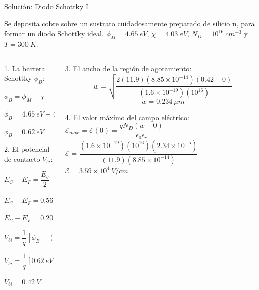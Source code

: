 \documentclass[10pt,t,aspectratio=169]{beamer}
\begin{document}
\begin{frame}{Solución: Diodo Schottky I}

Se deposita cobre sobre un sustrato cuidadosamente preparado de silicio n, para formar un diodo Schottky ideal. $\phi_M=4.65\ eV$, $\chi=4.03\ eV$, $N_D=10^{16}\ cm^{-3}$ y $T=300\ K$. 

\begin{columns}

\begin{column}{0.5\textwidth}

1. La barrera Schottky $\phi_B$:

$\phi_B = \phi_M - \chi$

$\phi_B = 4.65\ eV - 4.03\ eV$

$\phi_B = 0.62\ eV$

\vspace{5mm}

2. El potencial de contacto $V_{bi}$:

$E_C - E_F = \dfrac{E_g}{2} - kT \ln \dfrac{N_D}{n_i}$

$E_C - E_F = 0.56\ eV - 26\ meV \ln 10^6$

$E_C - E_F = 0.20\ eV$

$V_{bi} = \dfrac{1}{q} \left[ \phi_B - (E_C - E_F) \right]$

$V_{bi} = \dfrac{1}{q} \left[ 0.62\ eV - 0.20\ eV \right]$

$V_{bi} = 0.42\ V$
\end{column}

\begin{column}{0.5\textwidth}

3. El ancho de la región de agotamiento:
%
\[ w = \sqrt{\dfrac{2(11.9)(8.85\times{}10^{-14})(0.42 - 0)}{(1.6\times{}10^{-19})(10^{16})}} \]
%
\[ w = 0.234\ \mu m \]

\vspace{5mm}
4. El valor máximo del campo eléctrico:
%
$ \mathcal{E}_{max} = \mathcal{E}(0) = \dfrac{q N_D (w - 0)}{\epsilon_0 \epsilon_r} $
%
$ \mathcal{E} = \dfrac{(1.6\times{}10^{-19})(10^{16})(2.34\times{}10^{-5})}{(11.9)(8.85\times{}10^{-14})} $
%
$ \mathcal{E} = 3.59\times{}10^4\ V/cm $

\end{column}

\end{columns}
    
\end{frame}
\end{document}
